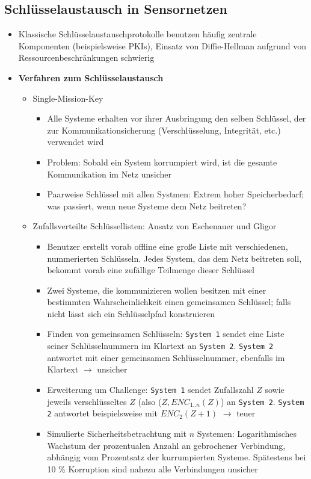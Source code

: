 \subsection{Schlüsselaustausch in Sensornetzen}
\begin{itemize}
	\item Klassische Schlüsselaustauschprotokolle benutzen häufig zentrale Komponenten (beispielsweise PKIs), Einsatz von Diffie-Hellman aufgrund von Ressourcenbeschränkungen schwierig
	\item \textbf{Verfahren zum Schlüsselaustausch}
	\begin{itemize}
		\item Single-Mission-Key
		\begin{itemize}
			\item Alle Systeme erhalten vor ihrer Ausbringung den selben Schlüssel, der zur Kommunikationsicherung (Verschlüsselung, Integrität, etc.) verwendet wird
			\item Problem: Sobald ein System korrumpiert wird, ist die gesamte Kommunikation im Netz unsicher
			\item Paarweise Schlüssel mit allen Systmen: Extrem hoher Speicherbedarf; was passiert, wenn neue Systeme dem Netz beitreten?
		\end{itemize}
		\item Zufallsverteilte Schlüssellisten: Ansatz von Eschenauer und Gligor
		\begin{itemize}
			\item Benutzer erstellt vorab offline eine große Liste mit verschiedenen, nummerierten Schlüsseln. Jedes System, das dem Netz beitreten soll, bekommt vorab eine zufällige Teilmenge dieser Schlüssel
			\item Zwei Systeme, die kommunizieren wollen besitzen mit einer bestimmten Wahrscheinlichkeit einen gemeinsamen Schlüssel; falls nicht lässt sich ein Schlüsselpfad konstruieren
			\item Finden von gemeinsamen Schlüsseln: \texttt{System 1} sendet eine Liste seiner Schlüsselnummern im Klartext an \texttt{System 2}. \texttt{System 2} antwortet mit einer gemeinsamen Schlüsselnummer, ebenfalls im Klartext \(\rightarrow\) unsicher
			\item Erweiterung um Challenge: \texttt{System 1} sendet Zufallszahl \(Z\) sowie jeweils verschlüsseltes \(Z\) (also (\(Z, ENC_{1..n}(Z)\)) an \texttt{System 2}. \texttt{System 2} antwortet beispielsweise mit \(ENC_2(Z+1)\) \(\rightarrow\) teuer
			\item Simulierte Sicherheitsbetrachtung mit \(n\) Systemen: Logarithmisches Wachstum der prozentualen Anzahl an gebrochener Verbindung, abhängig vom Prozentsatz der kurrumpierten Systeme. Spätestens bei 10 \% Korruption sind nahezu alle Verbindungen unsicher

\end{itemize}
\end{itemize}
\end{itemize}
